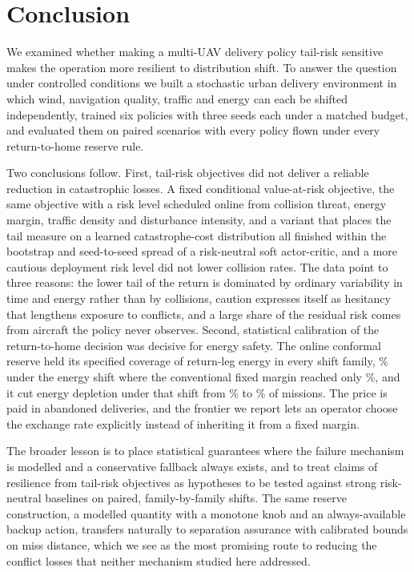 \section*{Conclusion}

We examined whether making a multi-UAV delivery policy tail-risk sensitive makes the operation more resilient to distribution shift. To answer the question under controlled conditions we built a stochastic urban delivery environment in which wind, navigation quality, traffic and energy can each be shifted independently, trained six policies with three seeds each under a matched budget, and evaluated them on paired scenarios with every policy flown under every return-to-home reserve rule.

Two conclusions follow. First, tail-risk objectives did not deliver a reliable reduction in catastrophic losses. A fixed conditional value-at-risk objective, the same objective with a risk level scheduled online from collision threat, energy margin, traffic density and disturbance intensity, and a variant that places the tail measure on a learned catastrophe-cost distribution all finished within the bootstrap and seed-to-seed spread of a risk-neutral soft actor-critic, and a more cautious deployment risk level did not lower collision rates. The data point to three reasons: the lower tail of the return is dominated by ordinary variability in time and energy rather than by collisions, caution expresses itself as hesitancy that lengthens exposure to conflicts, and a large share of the residual risk comes from aircraft the policy never observes. Second, statistical calibration of the return-to-home decision was decisive for energy safety. The online conformal reserve held its specified coverage of return-leg energy in every shift family, \RCrestcOnlineCovEnergy\% under the energy shift where the conventional fixed margin reached only \RCrestcStdCovEnergy\%, and it cut energy depletion under that shift from \RCrestcStdDepEnergy\% to \RCrestcOnlineDepEnergy\% of missions. The price is paid in abandoned deliveries, and the frontier we report lets an operator choose the exchange rate explicitly instead of inheriting it from a fixed margin.

The broader lesson is to place statistical guarantees where the failure mechanism is modelled and a conservative fallback always exists, and to treat claims of resilience from tail-risk objectives as hypotheses to be tested against strong risk-neutral baselines on paired, family-by-family shifts. The same reserve construction, a modelled quantity with a monotone knob and an always-available backup action, transfers naturally to separation assurance with calibrated bounds on miss distance, which we see as the most promising route to reducing the conflict losses that neither mechanism studied here addressed.
